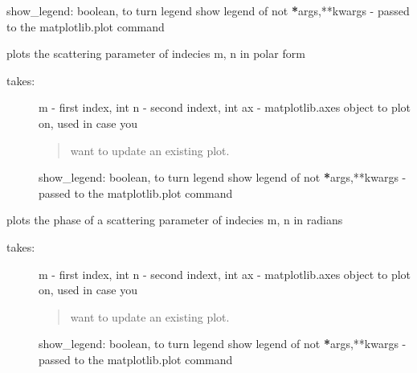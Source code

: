 \documentclass[letterpaper,10pt,english]{sphinxmanual}
\begin{document}
\begin{fulllineitems}
\begin{fulllineitems}
\begin{description}
show\_legend: boolean, to turn legend show legend of not
{\color{red}\bfseries{}*}args,**kwargs - passed to the matplotlib.plot command

\end{description}

\end{fulllineitems}


\begin{fulllineitems}
\label{api/mwavepy:mwavepy.network.Network.plot_s_polar}
plots the scattering parameter of indecies m, n in polar form
\begin{description}
\item[{takes:}] \leavevmode
m - first index, int
n - second indext, int
ax - matplotlib.axes object to plot on, used in case you
\begin{quote}

want to update an existing plot.
\end{quote}

show\_legend: boolean, to turn legend show legend of not
{\color{red}\bfseries{}*}args,**kwargs - passed to the matplotlib.plot command

\end{description}

\end{fulllineitems}


\begin{fulllineitems}
\label{api/mwavepy:mwavepy.network.Network.plot_s_rad}
plots the phase of a scattering parameter of indecies m, n in
radians
\begin{description}
\item[{takes:}] \leavevmode
m - first index, int
n - second indext, int
ax - matplotlib.axes object to plot on, used in case you
\begin{quote}

want to update an existing plot.
\end{quote}

show\_legend: boolean, to turn legend show legend of not
{\color{red}\bfseries{}*}args,**kwargs - passed to the matplotlib.plot command


\end{description}
\end{fulllineitems}
\end{fulllineitems}
\end{document}
